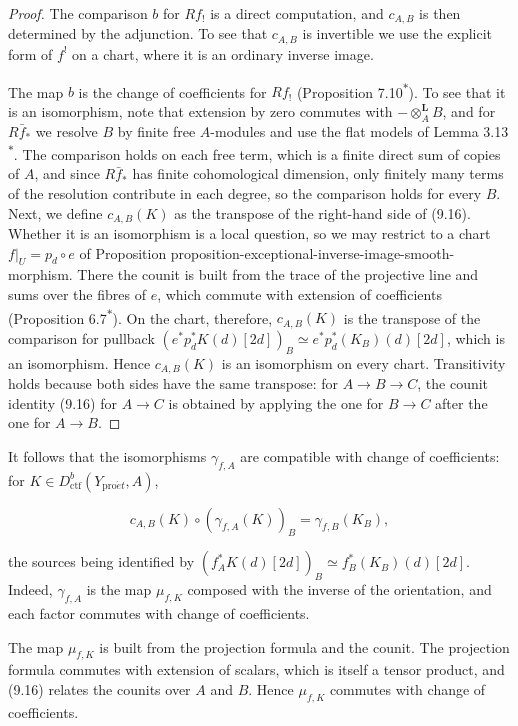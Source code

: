 \documentclass[11pt]{article}
\newcommand{\bpout}[1]{#1\textsuperscript{\hyperlink{bp-outside}{\ensuremath{\ast}}}}
\begin{document}
\begin{proof}[{Proof}]\label{bp48}%
The comparison \(b\) for \(Rf_!\) is a direct computation, and \(c_{A,B}\) is then determined by the adjunction. To see that \(c_{A,B}\) is invertible we use the explicit form of \(f^!\) on a chart, where it is an ordinary inverse image.

The map \(b\) is the change of coefficients for \(Rf_!\) (Proposition \bpout{7.10}). To see that it is an isomorphism, note that extension by zero commutes with \(-\otimes^{\mathbf L}_AB\), and for \(R\bar f_*\) we resolve \(B\) by finite free \(A\)-modules and use the flat models of Lemma \bpout{3.13}. The comparison holds on each free term, which is a finite direct sum of copies of \(A\), and since \(R\bar f_*\) has finite cohomological dimension, only finitely many terms of the resolution contribute in each degree, so the comparison holds for every \(B\). Next, we define \(c_{A,B}(K)\) as the transpose of the right-hand side of (9.16). Whether it is an isomorphism is a local question, so we may restrict to a chart \(f|_U=p_d\circ e\) of Proposition proposition-exceptional-inverse-image-smooth-morphism. There the counit is built from the trace of the projective line and sums over the fibres of \(e\), which commute with extension of coefficients (Proposition \bpout{6.7}). On the chart, therefore, \(c_{A,B}(K)\) is the transpose of the comparison for pullback \((e^*p_d^*K(d)[2d])_B\simeq e^*p_d^*(K_B)(d)[2d]\), which is an isomorphism. Hence \(c_{A,B}(K)\) is an isomorphism on every chart. Transitivity holds because both sides have the same transpose: for \(A\to B\to C\), the counit identity (9.16) for \(A\to C\) is obtained by applying the one for \(B\to C\) after the one for \(A\to B\).
\end{proof}

\label{bp49}%
It follows that the isomorphisms \(\gamma_{f,A}\) are compatible with change of coefficients: for \(K\in D^b_{\mathrm{ctf}}(Y_{\mathrm{pro}\acute{e}t},A)\),

\[
c_{A,B}(K)\circ(\gamma_{f,A}(K))_B=\gamma_{f,B}(K_B),
\tag{9.17}
\]

the sources being identified by \((f_A^*K(d)[2d])_B\simeq f_B^*(K_B)(d)[2d]\). Indeed, \(\gamma_{f,A}\) is the map \(\mu_{f,K}\) composed with the inverse of the orientation, and each factor commutes with change of coefficients.

The map \(\mu_{f,K}\) is built from the projection formula and the counit. The projection formula commutes with extension of scalars, which is itself a tensor product, and (9.16) relates the counits over \(A\) and \(B\). Hence \(\mu_{f,K}\) commutes with change of coefficients.
\end{document}
